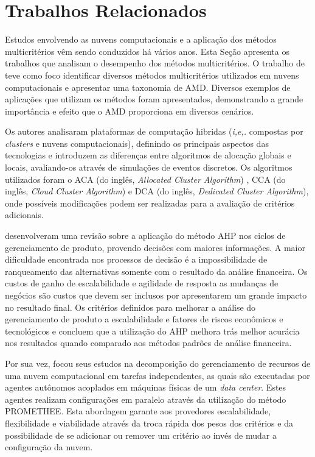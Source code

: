 \chapter{Trabalhos Relacionados}
\label{ch:relacionados}

Estudos envolvendo as nuvens computacionais e a aplicação dos métodos multicritérios vêm sendo conduzidos há vários anos. Esta Seção apresenta os trabalhos que analisam o desempenho dos métodos multicritérios.
%
O trabalho de  teve como foco identificar diversos métodos multicritérios utilizados em nuvens computacionais e apresentar uma taxonomia de AMD. Diversos exemplos de aplicações que utilizam os métodos foram apresentados, demonstrando a grande importância e efeito que o AMD proporciona em diversos cenários. 

Os autores  analisaram plataformas de computação hibridas (\textit{i,e,.} compostas por \textit{clusters} e nuvens computacionais), definindo os principais aspectos das tecnologias e introduzem as diferenças entre algoritmos de alocação globais e locais, avaliando-os através de simulações de eventos discretos. Os algoritmos utilizados foram o ACA (do inglês, \textit{Allocated Cluster Algorithm}) , CCA (do inglês, \textit{Cloud Cluster Algorithm}) e DCA (do inglês, \textit{Dedicated Cluster Algorithm}), onde possíveis modificações podem ser realizadas para a avaliação de critérios adicionais. 

 desenvolveram uma revisão sobre a aplicação do método AHP nos ciclos de gerenciamento de produto, provendo decisões com maiores informações. A maior dificuldade encontrada nos processos de decisão é a impossibilidade de ranqueamento das alternativas somente com o resultado da análise financeira. Os custos de ganho de escalabilidade e agilidade de resposta as mudanças de negócios são custos que devem ser inclusos por apresentarem um grande impacto no resultado final. Os critérios definidos para melhorar a análise do gerenciamento de produto a escalabilidade e fatores de riscos econômicos e tecnológicos e concluem que a utilização do AHP melhora trás melhor acurácia nos resultados quando comparado aos métodos padrões de análise financeira.

Por sua vez,  focou seus estudos na decomposição do gerenciamento de recursos de uma nuvem computacional em tarefas independentes, as quais são executadas por agentes autônomos acoplados em máquinas físicas de um \textit{data center}. Estes agentes realizam configurações em paralelo através da utilização do método PROMETHEE. Esta abordagem garante aos provedores escalabilidade, flexibilidade e viabilidade através da troca rápida dos pesos dos critérios e da possibilidade de se adicionar ou remover um critério ao invés de mudar a configuração da nuvem.

